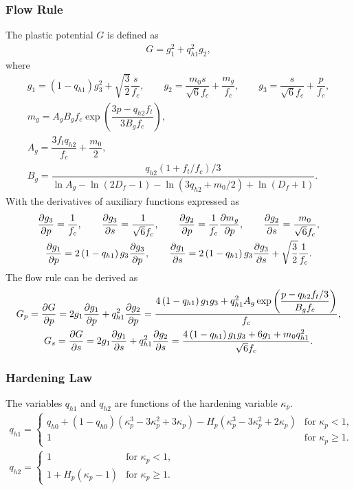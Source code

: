 \subsubsection{Flow Rule}
The plastic potential $G$ is defined as
\begin{gather}
G=g_1^2+q^2_{h1}g_2,
\end{gather}
where
\begin{gather}
g_1=\left(1-q_{h1}\right)g_3^2+\sqrt{\dfrac{3}{2}}\dfrac{s}{f_c},\qquad
g_2=\dfrac{m_0s}{\sqrt{6}f_c}+\dfrac{m_g}{f_c},\qquad
g_3=\dfrac{s}{\sqrt{6}f_c}+\dfrac{p}{f_c},\\
m_g=A_gB_gf_c\exp\left(\dfrac{3p-q_{h2}f_t}{3B_gf_c}\right),\\
A_g=\dfrac{3f_tq_{h2}}{f_c}+\dfrac{m_0}{2},\\
B_g=\dfrac{q_{h2}\left(1+f_t/f_c\right)/3}{\ln{}A_g-\ln\left(2D_f-1\right)-\ln\left(3q_{h2}+m_0/2\right)+\ln\left(D_f+1\right)}.
\end{gather}
With the derivatives of auxiliary functions expressed as
\begin{gather}
\dfrac{\partial{g_3}}{\partial{p}}=\dfrac{1}{f_c},\qquad\dfrac{\partial{g_3}}{\partial{s}}=\dfrac{1}{\sqrt{6}f_c},\qquad
\dfrac{\partial{g_2}}{\partial{p}}=\dfrac{1}{f_c}\dfrac{\partial{m_g}}{\partial{p}},\qquad\dfrac{\partial{g_2}}{\partial{s}}=\dfrac{m_0}{\sqrt{6}f_c},\\
\dfrac{\partial{g_1}}{\partial{p}}=2\left(1-q_{h1}\right)g_3\dfrac{\partial{g_3}}{\partial{p}},\qquad\dfrac{\partial{g_1}}{\partial{s}}=2\left(1-q_{h1}\right)g_3\dfrac{\partial{g_3}}{\partial{s}}+\sqrt{\dfrac{3}{2}}\dfrac{1}{f_c}.
\end{gather}
The flow rule can be derived as
\begin{gather}
G_p=\dfrac{\partial{G}}{\partial{p}}=2g_1\dfrac{\partial{g_1}}{\partial{p}}+q^2_{h1}\dfrac{\partial{g_2}}{\partial{p}}=\dfrac{4\left(1-q_{h1}\right)g_1g_3+q^2_{h1}A_g\exp\left(\dfrac{p-q_{h2}f_t/3}{B_gf_c}\right)}{f_c},\\
G_s=\dfrac{\partial{G}}{\partial{s}}=2g_1\dfrac{\partial{g_1}}{\partial{s}}+q^2_{h1}\dfrac{\partial{g_2}}{\partial{s}}=\dfrac{4\left(1-q_{h1}\right)g_1g_3+6g_1+m_0q^2_{h1}}{\sqrt{6}f_c}.
\end{gather}
\subsubsection{Hardening Law}
The variables $q_{h1}$ and $q_{h2}$ are functions of the hardening variable $\kappa_p$.
\begin{gather}
q_{h1}=\left\{
\begin{array}{ll}
q_{h0}+\left(1-q_{h0}\right)\left(\kappa_p^3-3\kappa_p^2+3\kappa_p\right)-H_p\left(\kappa_p^3-3\kappa_p^2+2\kappa_p\right)&\text{for~}\kappa_p<1,\\
1&\text{for~}\kappa_p\geqslant1.
\end{array}
\right.\\
q_{h2}=\left\{
\begin{array}{ll}
1&\text{for~}\kappa_p<1,\\
1+H_p\left(\kappa_p-1\right)&\text{for~}\kappa_p\geqslant1.
\end{array}
\right.
\end{gather}


